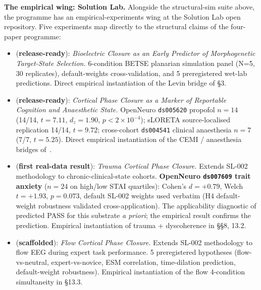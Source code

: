 \documentclass[11pt]{article}
\theoremstyle{plain}
\theoremstyle{definition}
\theoremstyle{remark}
\begin{document}
\textbf{The empirical wing: Solution Lab.} Alongside the structural-sim suite above, the programme has an empirical-experiments wing at the Solution Lab open repository. Five experiments map directly to the structural claims of the four-paper programme:

\begin{itemize}[leftmargin=2em]
\item \citet{SolutionLab001} (\textbf{release-ready}): \emph{Bioelectric Closure as an Early Predictor of Morphogenetic Target-State Selection.} 6-condition BETSE planarian simulation panel (N=5, 30 replicates), default-weights cross-validation, and 5 preregistered wet-lab predictions. Direct empirical instantiation of the Levin bridge of \citet{SmartProcessingToPOV} \S 3.
\item \citet{SolutionLab002} (\textbf{release-ready}): \emph{Cortical Phase Closure as a Marker of Reportable Cognition and Anaesthetic State.} OpenNeuro \texttt{ds005620} propofol $n = 14$ (14/14, $t = 7.11$, $d_z = 1.90$, $p < 2 \times 10^{-4}$); sLORETA source-localised replication 14/14, $t = 9.72$; cross-cohort \texttt{ds004541} clinical anaesthesia $n = 7$ (7/7, $t = 5.25$). Direct empirical instantiation of the CEMI / anaesthesia bridges of~\citet{SmartProcessingToPOV}.
\item \citet{SolutionLab005} (\textbf{first real-data result}): \emph{Trauma Cortical Phase Closure.} Extends SL-002 methodology to chronic-clinical-state cohorts. \textbf{OpenNeuro \texttt{ds007609} trait anxiety} ($n = 24$ on high/low STAI quartiles): Cohen's $d = +0.79$, Welch $t = +1.93$, $p = 0.073$, default SL-002 weights used verbatim (H4 default-weight robustness validated cross-application). The applicability diagnostic of \citet{SmartClosureDistance} predicted PASS for this substrate \emph{a priori}; the empirical result confirms the prediction. Empirical instantiation of trauma + dyscoherence in \citet{SmartLifeAsClosure} \S\S 8, 13.2.
\item \citet{SolutionLab006} (\textbf{scaffolded}): \emph{Flow Cortical Phase Closure.} Extends SL-002 methodology to flow EEG during expert task performance. 5 preregistered hypotheses (flow-vs-neutral, expert-vs-novice, ESM correlation, time-dilation prediction, default-weight robustness). Empirical instantiation of the flow 4-condition simultaneity in \citet{SmartLifeAsClosure} \S 13.3.

\end{itemize}
\end{document}
